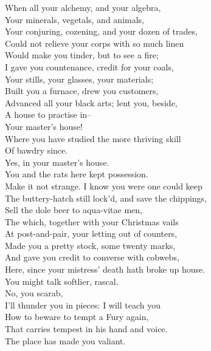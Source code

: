 \documentclass{memoir}
\begin{document}
\begin{drama*}
\facespeaks  When all your alchemy, and your algebra,\\
 Your minerals, vegetals, and animals,\\
 Your conjuring, cozening, and your dozen of trades,\\
 Could not relieve your corps with so much linen\\
 Would make you tinder, but to see a fire;\\
 I gave you countenance, credit for your coals,\\
 Your stills, your glasses, your materials;\\
 Built you a furnace, drew you customers,\\
 Advanced all your black arts; lent you, beside,\\
 A house to practise in--\\
\subtlespeaks {} Your master's house!\\
\facespeaks  Where you have studied the more thriving skill\\
 Of bawdry since.\\
\subtlespeaks {} Yes, in your master's house.\\
 You and the rats here kept possession.\\
 Make it not strange. I know you were one could keep\\
 The buttery-hatch still lock'd, and save the chippings,\\
 Sell the dole beer to aqua-vitae men,\\
 The which, together with your Christmas vails\\
 At post-and-pair, your letting out of counters,\\
 Made you a pretty stock, some twenty marks,\\
 And gave you credit to converse with cobwebs,\\
 Here, since your mistress' death hath broke up house.\\
\facespeaks  You might talk softlier, rascal.\\
\subtlespeaks {} No, you scarab,\\
 I'll thunder you in pieces: I will teach you\\
 How to beware to tempt a Fury again,\\
 That carries tempest in his hand and voice.\\
\facespeaks  The place has made you valiant.\\

\end{drama*}
\end{document}
